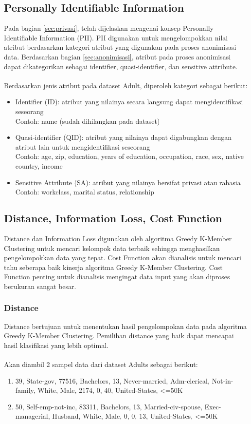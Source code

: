 \subsection{Personally Identifiable Information}
Pada bagian \ref{sec:privasi}, telah dijelaskan mengenai konsep Personally Identifiable Information (PII). PII digunakan untuk mengelompokkan nilai atribut berdasarkan kategori atribut yang digunakan pada proses anonimisasi data. Berdasarkan bagian \ref{sec:anonimisasi}, atribut pada proses anonimisasi dapat dikategorikan sebagai identifier, quasi-identifier, dan sensitive attribute. 
\\\\
\noindent Berdasarkan jenis atribut pada dataset Adult, diperoleh kategori sebagai berikut:
\begin{itemize}
\item Identifier (ID): atribut yang nilainya secara langsung dapat mengidentifikasi seseorang\\
Contoh: name (sudah dihilangkan pada dataset)
\item Quasi-identifier (QID): atribut yang nilainya dapat digabungkan dengan atribut lain untuk mengidentifikasi seseorang\\
Contoh: age, zip, education, years of education, occupation, race, sex, native country, income
\item Sensitive Attribute (SA): atribut yang nilainya bersifat privasi atau rahasia\\
Contoh: workclass, marital status, relationship
\end{itemize}

\subsection{Distance, Information Loss, Cost Function}
Distance dan Information Loss digunakan oleh algoritma Greedy K-Member Clustering untuk mencari kelompok data terbaik sehingga menghasilkan pengelompokkan data yang tepat. Cost Function akan dianalisis untuk mencari tahu seberapa baik kinerja algoritma Greedy K-Member Clustering. Cost Function penting untuk dianalisis mengingat data input yang akan diproses berukuran sangat besar.

\subsubsection{Distance}
Distance bertujuan untuk menentukan hasil pengelompokan data pada algoritma Greedy K-Member Clustering. Pemilihan distance yang baik dapat mencapai hasil klasifikasi yang lebih optimal.
\\\\
\noindent Akan diambil 2 sampel data dari dataset Adults sebagai berikut:
\begin{enumerate}
\item 39, State-gov, 77516, Bachelors, 13, Never-married, Adm-clerical, Not-in-family, White, Male, 2174, 0, 40, United-States, <=50K
\item 50, Self-emp-not-inc, 83311, Bachelors, 13, Married-civ-spouse, Exec-managerial, Husband, White, Male, 0, 0, 13, United-States, <=50K
\end{enumerate}


